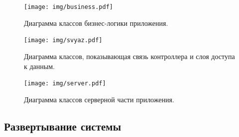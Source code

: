 \begin{figure}[H]
	\centering
	\texttt{[image: img/business.pdf]}
	\caption{Диаграмма классов бизнес-логики приложения.}
	\label{fig:business}
\end{figure}

\begin{figure}[H]
	\centering
	\texttt{[image: img/svyaz.pdf]}
	\caption{Диаграмма классов, показывающая связь контроллера и слоя доступа к данным.}
	\label{fig:svyaz}
\end{figure}

\begin{figure}[H]
	\centering
	\texttt{[image: img/server.pdf]}
	\caption{Диаграмма классов серверной части приложения.}
	\label{fig:server}
\end{figure}

\subsection{Развертывание системы}

